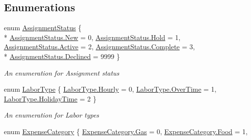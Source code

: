 \subsection*{Enumerations}
\begin{DoxyCompactItemize}
\item 
enum \hyperlink{namespace_field_service_1_1_data_a87f0c66830f2bf43c90c245213fc3263}{Assignment\+Status} \{ \\*
\hyperlink{namespace_field_service_1_1_data_a87f0c66830f2bf43c90c245213fc3263a03c2e7e41ffc181a4e84080b4710e81e}{Assignment\+Status.\+New} = 0, 
\hyperlink{namespace_field_service_1_1_data_a87f0c66830f2bf43c90c245213fc3263abcd8db575b47c838e5d551e3973db4ac}{Assignment\+Status.\+Hold} = 1, 
\hyperlink{namespace_field_service_1_1_data_a87f0c66830f2bf43c90c245213fc3263a4d3d769b812b6faa6b76e1a8abaece2d}{Assignment\+Status.\+Active} = 2, 
\hyperlink{namespace_field_service_1_1_data_a87f0c66830f2bf43c90c245213fc3263aae94f80b3ce82062a5dd7815daa04f9d}{Assignment\+Status.\+Complete} = 3, 
\\*
\hyperlink{namespace_field_service_1_1_data_a87f0c66830f2bf43c90c245213fc3263a616b5940be86c327aaa5090f50c061f5}{Assignment\+Status.\+Declined} = 9999
 \}
\begin{DoxyCompactList}\small\item\em An enumeration for Assignment status \end{DoxyCompactList}\item 
enum \hyperlink{namespace_field_service_1_1_data_a20c89d9b67c465f840b3ef27a026afd6}{Labor\+Type} \{ \hyperlink{namespace_field_service_1_1_data_a20c89d9b67c465f840b3ef27a026afd6a769cb50c95fd3a43c659aa73aba99e5b}{Labor\+Type.\+Hourly} = 0, 
\hyperlink{namespace_field_service_1_1_data_a20c89d9b67c465f840b3ef27a026afd6a9afbbb6a5bfc89df3c34abd06946765f}{Labor\+Type.\+Over\+Time} = 1, 
\hyperlink{namespace_field_service_1_1_data_a20c89d9b67c465f840b3ef27a026afd6a3ad31d3472bf5241edd2aa17ff1375dc}{Labor\+Type.\+Holiday\+Time} = 2
 \}
\begin{DoxyCompactList}\small\item\em An enumeration for Labor types \end{DoxyCompactList}\item 
enum \hyperlink{namespace_field_service_1_1_data_a6565a839d23a4c941ba4a771c1e22163}{Expense\+Category} \{ \hyperlink{namespace_field_service_1_1_data_a6565a839d23a4c941ba4a771c1e22163a635459702f9817de29e608fa3395637c}{Expense\+Category.\+Gas} = 0, 
\hyperlink{namespace_field_service_1_1_data_a6565a839d23a4c941ba4a771c1e22163a0a38e7286ebbb560354992b3ce62be67}{Expense\+Category.\+Food} = 1, 

\end{DoxyCompactItemize}
